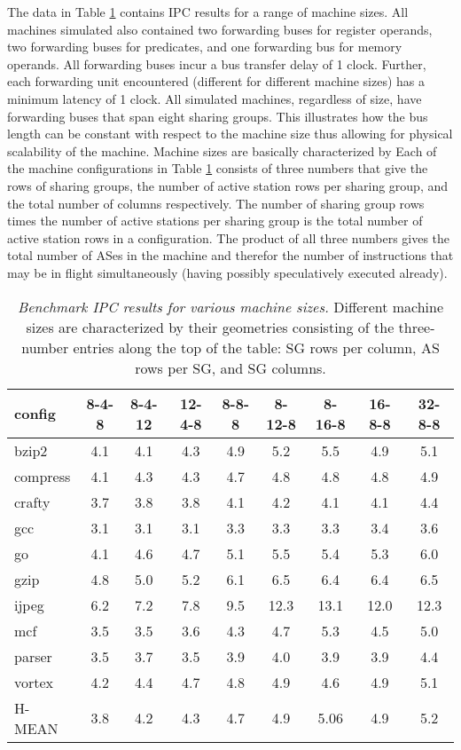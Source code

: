\documentclass[10pt,dvips]{article}
\begin{document}
%
The data in Table \ref{tab:ipc1} contains IPC 
results for a range of machine sizes.
All machines simulated also contained two forwarding buses for
register operands, two forwarding buses for predicates, and
one forwarding bus for memory operands.
All forwarding buses incur a bus transfer delay of 1 clock.
Further, each forwarding unit encountered (different for different
machine sizes) has a minimum latency of 1 clock.
All simulated machines, regardless of size, have forwarding buses
that span eight sharing groups.  This illustrates how the bus
length can be constant with respect to the machine size thus allowing
for physical scalability of the machine.
Machine sizes are basically characterized by
Each of the machine configurations in Table \ref{tab:ipc1} consists of three
numbers that give the rows of sharing groups, the number
of active station rows per sharing group, and the total number of 
columns respectively.  The number of sharing group rows times the
number of active stations per sharing group is the total number of
active station rows in a configuration.  The product of all three
numbers gives the total number of ASes in the machine and therefor
the number of instructions that may be in flight 
simultaneously
(having
possibly speculatively executed already).
%
\begin{table}
\begin{center}
\caption{{\em Benchmark IPC results for various machine sizes.}
Different machine sizes are characterized by their
geometries consisting of the three-number entries along the
top of the table: SG rows per column, AS rows per SG, and
SG columns.}
\label{tab:ipc1}
\begin{tabular}{|l|c|c|c|c|c|c|c|c|}
\hline 
config&
8-4-8&8-4-12&12-4-8&8-8-8&8-12-8&8-16-8&16-8-8&32-8-8\\
\hline
\hline 
bzip2&4.1&4.1&4.3&4.9&5.2&5.5&4.9&5.1\\
\hline 
compress&4.1&4.3&4.3&4.7&4.8&4.8&4.8&4.9\\
\hline 
crafty&3.7&3.8&3.8&4.1&4.2&4.1&4.1&4.4\\
\hline 
gcc&3.1&3.1&3.1&3.3&3.3&3.3&3.4&3.6\\
\hline 
go&4.1&4.6&4.7&5.1&5.5&5.4&5.3&6.0\\
\hline 
gzip&4.8&5.0&5.2&6.1&6.5&6.4&6.4&6.5\\
\hline 
ijpeg&6.2&7.2&7.8&9.5&12.3&13.1&12.0&12.3\\
\hline 
mcf&3.5&3.5&3.6&4.3&4.7&5.3&4.5&5.0\\
\hline 
parser&3.5&3.7&3.5&3.9&4.0&3.9&3.9&4.4\\
\hline 
vortex&4.2&4.4&4.7&4.8&4.9&4.6&4.9&5.1\\
\hline 
\hline 
H-MEAN&3.8&4.2&4.3&4.7&4.9&5.06&4.9&5.2\\
\hline
\end{tabular}
\end{center}
\end{table}
\end{document}
